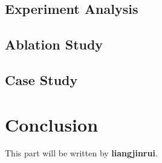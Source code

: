 \documentclass{article}
\begin{document}
\subsection{Experiment Analysis}
\subsection{Ablation Study}
\subsection{Case Study}

\section{Conclusion}
This part will be written by {\bf liangjinrui}.

\newpage


\end{document}
